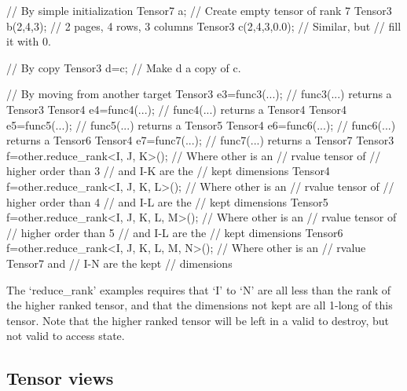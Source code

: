 \begin{code}
// By simple initialization
Tensor7 a;            // Create empty tensor of rank 7
Tensor3 b(2,4,3);     // 2 pages, 4 rows, 3 columns
Tensor3 c(2,4,3,0.0); // Similar, but
                      // fill it with 0.

// By copy
Tensor3 d=c;          // Make d a copy of c.

// By moving from another target
Tensor3 e3=func3(...);  // func3(...) returns a Tensor3
Tensor4 e4=func4(...);  // func4(...) returns a Tensor4
Tensor4 e5=func5(...);  // func5(...) returns a Tensor5
Tensor4 e6=func6(...);  // func6(...) returns a Tensor6
Tensor4 e7=func7(...);  // func7(...) returns a Tensor7
Tensor3 f=other.reduce_rank<I, J, K>();  // Where other is an
                                         // rvalue tensor of
                                         // higher order than 3
                                         // and I-K are the
                                         // kept dimensions
Tensor4 f=other.reduce_rank<I, J, K, L>();  // Where other is an
                                         // rvalue tensor of
                                         // higher order than 4
                                         // and I-L are the
                                         // kept dimensions
Tensor5 f=other.reduce_rank<I, J, K, L, M>();  // Where other is an
                                         // rvalue tensor of
                                         // higher order than 5
                                         // and I-L are the
                                         // kept dimensions
Tensor6 f=other.reduce_rank<I, J, K, L, M, N>();  // Where other is an
                                         // rvalue Tensor7 and
                                         // I-N are the kept
                                         // dimensions
\end{code}

The `reduce\_rank' examples requires that `I' to `N' are all less than the rank of the 
higher ranked tensor,
and that the dimensions not kept are all 1-long of this tensor.  Note that the
higher ranked tensor will be left in a valid to destroy, but not valid to access state.

\subsection{Tensor views}

